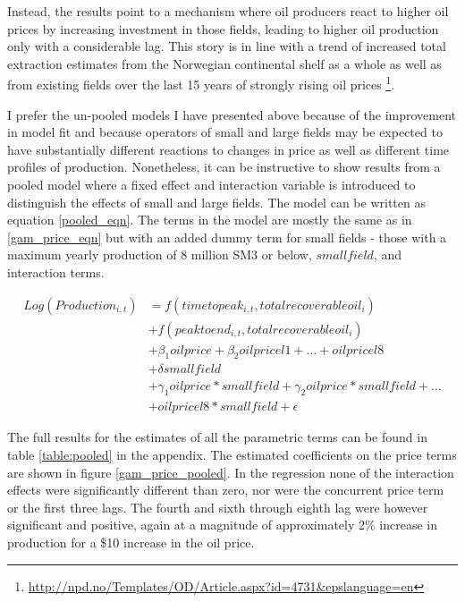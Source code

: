 \documentclass[12pt]{article}
\begin{document}
Instead, the results point to a mechanism where oil producers react to higher oil prices by increasing investment in those fields, leading to higher oil production only with a considerable lag.   This story is in line with a trend of increased total extraction estimates from the Norwegian continental shelf as a whole as well as from existing fields over the last 15 years of strongly rising oil prices \footnote{\url{http://npd.no/Templates/OD/Article.aspx?id=4731&epslanguage=en}}.

I prefer the un-pooled models I have presented above because of the improvement in model fit and because operators of small and large fields may be expected to have substantially different reactions to changes in price as well as different time profiles of production. Nonetheless, it can be instructive to show results from a pooled model where a fixed effect and interaction variable is introduced to distinguish the effects of small and large fields. The model can be written as equation \ref{pooled_eqn}.  The terms in the model are mostly the same as in \ref{gam_price_eqn} but with an added dummy term for small fields - those with a maximum yearly production of 8 million SM3 or below, $smallfield$, and interaction terms.  

\begin{equation}
\begin{split}
	Log(Production_{i,t})&=f(timetopeak_{i,t}, totalrecoverableoil_i) \\
	 \quad & + f(peaktoend_{i,t}, totalrecoverableoil_i) \\
	 \quad & + \beta_1 oilprice + \beta_2 oilpricel1 + \dots + oilpricel8\\
	 \quad & + \delta smallfield \\
 	 \quad & + \gamma_1 oilprice*smallfield + \gamma_2 oilprice*smallfield + \dots \\
 	 \quad & + oilpricel8*smallfield +  \epsilon
\label{pooled_eqn}
\end{split}
\end{equation}

The full results for the estimates of all the parametric terms can be found in table \ref{table:pooled} in the appendix.  The estimated coefficients on the price terms are shown in figure \ref{gam_price_pooled}. In the regression none of the interaction effects were significantly different than zero, nor were the concurrent price term or the first three lags.  The fourth and sixth through eighth lag were however significant and positive, again at a magnitude of approximately 2\% increase in production for a \$10 increase in the oil price.
\end{document}
